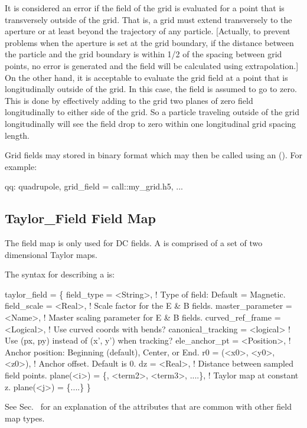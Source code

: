 It is considered an error if the field of the grid is evaluated for a point that is transversely
outside of the grid. That is, a grid must extend transversely to the aperture or at least beyond the
trajectory of any particle. [Actually, to prevent problems when the aperture is set at the grid
boundary, if the distance between the particle and the grid boundary is within 1/2 of the spacing
between grid points, no error is generated and the field will be calculated using extrapolation.] On
the other hand, it is acceptable to evaluate the grid field at a point that is longitudinally
outside of the grid. In this case, the field is assumed to go to zero. This is done by effectively
adding to the grid two planes of zero field longitudinally to either side of the grid. So a particle
traveling outside of the grid longitudinally will see the field drop to zero within one longitudinal
grid spacing length.

Grid fields may stored in  binary format which may then be called using an 
(). For example:
\begin{example}
  qq: quadrupole, grid_field = call::my_grid.h5, ...
\end{example}

\subsection{Taylor_Field Field Map}
\label{s:taylor.field}

The  field map is only used for DC fields. A  is comprised
of a set of two dimensional Taylor maps.  

The syntax for describing a  is:
\begin{example}
  taylor_field = \{
    field_type       = <String>,           ! Type of field: Default = Magnetic.
    field_scale      = <Real>,             ! Scale factor for the E & B fields.
    master_parameter = <Name>,             ! Master scaling parameter for E & B fields.
    curved_ref_frame   = <Logical>,        ! Use curved coords with bends?
    canonical_tracking = <logical>         ! Use (px, py) instead of (x', y') when tracking?
    ele_anchor_pt    = <Position>,         ! Anchor position: Beginning (default), Center, or End.
    r0               = (<x0>, <y0>, <z0>), ! Anchor offset. Default is 0.
    dz               = <Real>,             ! Distance between sampled field points.
    plane(<i>) = \{<term1>, <term2>, <term3>, ....\}, ! Taylor map at constant z.
    plane(<j>) = \{....\}  \}
\end{example}
See Sec.~ for an explanation of the attributes that are common with
other field map types.

